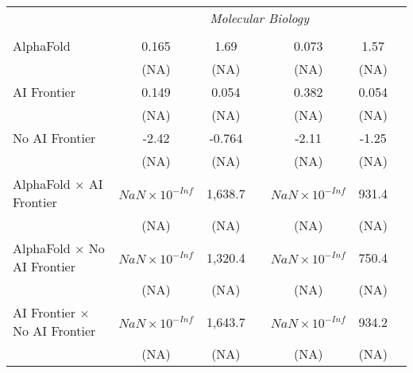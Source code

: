 \begin{tabular}{lcccccc}
 & \multicolumn{6}{c}{\textit{Molecular Biology}} \\ \\
   AlphaFold                                                                  & 0.165                  & 1.69    &          & 0.073                  & 1.57  &   \\   
                                                                              & (NA)                   & (NA)    &          & (NA)                   & (NA)  &   \\   
   AI Frontier                                                                & 0.149                  & 0.054   &          & 0.382                  & 0.054 &   \\   
                                                                              & (NA)                   & (NA)    &          & (NA)                   & (NA)  &   \\   
   No AI Frontier                                                             & -2.42                  & -0.764  &          & -2.11                  & -1.25 &   \\   
                                                                              & (NA)                   & (NA)    &          & (NA)                   & (NA)  &   \\   
   AlphaFold $\times$ AI Frontier                                             & $NaN\times 10^{-Inf}$  & 1,638.7 &          & $NaN\times 10^{-Inf}$  & 931.4 &   \\   
                                                                              & (NA)                   & (NA)    &          & (NA)                   & (NA)  &   \\   
   AlphaFold $\times$ No AI Frontier                                          & $NaN\times 10^{-Inf}$  & 1,320.4 &          & $NaN\times 10^{-Inf}$  & 750.4 &   \\   
                                                                              & (NA)                   & (NA)    &          & (NA)                   & (NA)  &   \\   
   AI Frontier $\times$ No AI Frontier                                        & $NaN\times 10^{-Inf}$  & 1,643.7 &          & $NaN\times 10^{-Inf}$  & 934.2 &   \\   
                                                                              & (NA)                   & (NA)    &          & (NA)                   & (NA)  &   \\   

\end{tabular}
